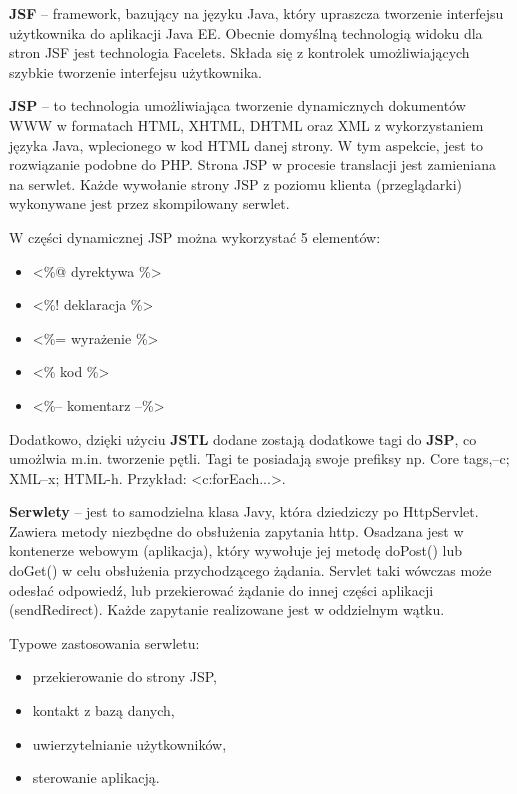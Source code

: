 \textbf{JSF} --  framework, bazujący na języku Java, który upraszcza tworzenie interfejsu użytkownika do aplikacji Java EE. Obecnie domyślną technologią widoku dla stron JSF jest technologia Facelets. Składa się z kontrolek umożliwiających szybkie tworzenie interfejsu użytkownika.

\textbf{JSP} --  to technologia umożliwiająca tworzenie dynamicznych dokumentów WWW w formatach HTML, XHTML, DHTML oraz XML z wykorzystaniem języka Java, wplecionego w kod HTML danej strony. W tym aspekcie, jest to rozwiązanie podobne do PHP. Strona JSP w procesie translacji jest zamieniana na serwlet. Każde wywołanie strony JSP z poziomu klienta (przeglądarki) wykonywane jest przez skompilowany serwlet. 

W części dynamicznej JSP można wykorzystać 5 elementów:
\begin{itemize}
    \item <\%@ dyrektywa \%> 
    \item <\%! deklaracja \%>
    \item <\%= wyrażenie \%>
    \item <\% kod \%>
    \item <\%-- komentarz --\%>
\end{itemize}

Dodatkowo, dzięki użyciu \textbf{JSTL} dodane zostają dodatkowe tagi do \textbf{JSP}, co umożlwia m.in. tworzenie pętli. Tagi te posiadają swoje prefiksy np. Core tags,–c; XML–x; HTML-h. Przykład: <c:forEach...>.

\textbf{Serwlety} -- jest to samodzielna klasa Javy, która dziedziczy po HttpServlet. Zawiera metody niezbędne do obsłużenia zapytania http. Osadzana jest w kontenerze webowym (aplikacja), który wywołuje jej metodę doPost() lub doGet() w celu obsłużenia przychodzącego żądania. Servlet taki wówczas może odesłać odpowiedź, lub przekierować żądanie do innej części aplikacji (sendRedirect). Każde zapytanie realizowane jest w oddzielnym wątku.

Typowe zastosowania serwletu:
\begin{itemize}
    \item przekierowanie do strony JSP,
    \item kontakt z bazą danych,
    \item uwierzytelnianie użytkowników,
    \item sterowanie aplikacją.
\end{itemize}

